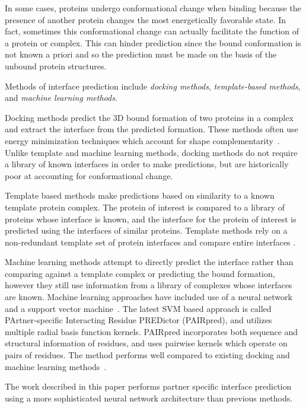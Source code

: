 In some cases, proteins undergo conformational change when binding because the presence of another protein changes the most energetically favorable state. 
In fact, sometimes this conformational change can actually facilitate the function of a protein or complex.
This can hinder prediction since the bound conformation is not known a priori and so the prediction must be made on the basis of the unbound protein structures. 

Methods of interface prediction include \textit{docking methods}, \textit{template-based methods}, and \textit{machine learning methods}.

Docking methods predict the 3D bound formation of two proteins in a complex and extract the interface from the predicted formation. 
These methods often use energy minimization techniques which account for shape complementarity~\cite{chen2003}\cite{zundert2016}.
Unlike template and machine learning methods, docking methods do not require a library of known interfaces in order to make predictions, but are historically poor at accounting for conformational change\cite{ezkurdia2009}.

Template based methods make predictions based on similarity to a known template protein complex.
The protein of interest is compared to a library of proteins whose interface is known, and the interface for the protein of interest is predicted using the interfaces of similar proteins.
Template methods rely on a non-redundant template set of protein interfaces and compare entire interfaces \cite{tuncbag2011}.

Machine learning methods attempt to directly predict the interface rather than comparing against a template complex or predicting the bound formation, however they still use information from a library of complexes whose interfaces are known.
Machine learning approaches have included use of a neural network~\cite{ahmad2011} and a support vector machine~\cite{minhas2014}.
The latest SVM based approach is called PArtner-specific Interacting Residue PREDictor (PAIRpred), and utilizes multiple radial basis function kernels.
PAIRpred incorporates both sequence and structural information of residues, and uses pairwise kernels which operate on pairs of residues.
The method performs well compared to existing docking and machine learning methods~\cite{minhas2014}.



The work described in this paper performs partner specific interface prediction using a more sophisticated neural network architecture than previous methods. 


